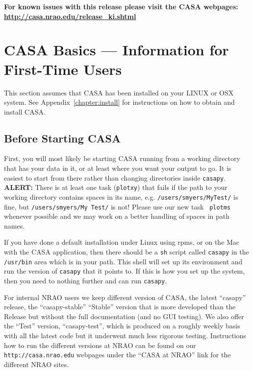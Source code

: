 {\bf For known issues with this release please visit the CASA webpages:\\ \url{http://casa.nrao.edu/release_ki.shtml}}


\section{CASA Basics --- Information for First-Time Users}
\label{section:intro.basics}

This section assumes that CASA has been installed on your LINUX or OSX
system.  See Appendix~\ref{chapter:install} for instructions on how to 
obtain and install CASA.  

\subsection{Before Starting CASA}
\label{section:intro.basics.before}

First, you will most likely be starting CASA running from a working
directory that has your data in it, or at least where you want your
output to go.  It is easiest to start from there rather than changing
directories inside {\tt casapy}.
{\bf ALERT:} There is at least one task ({\tt plotxy}) that 
fails if the path to your working directory contains spaces in
its name, e.g. {\tt /users/smyers/MyTest/} is fine, but 
{\tt /users/smyers/My\ Test/} is not!  Please use our new task {\tt
  plotms} whenever possible and we may work on a better handling of
spaces in path names. 

If you have done a default installation under Linux using rpms, or 
on the Mac with the CASA application, then there should be a {\tt sh}
script called {\tt casapy} in the {\tt /usr/bin} area which is in
your path.  This shell will set up its environment and run the version
of {\tt casapy} that it points to.  If this is how you set up the
system, then you need to nothing further and can run {\tt casapy}.


For internal NRAO users we keep different version of CASA, the latest
``casapy'' release, the ``casapy-stable'' ``Stable'' version that is more
developed than the Release but without the full documentation (and no
GUI testing). We also offer the ``Test'' version, ``casapy-test'', which is
produced on a roughly weekly basis with all the latest code but it
underwent much less rigorous testing. Instructions how to run the
different versions at NRAO can be found on our
\verb=http://casa.nrao.edu= webpages under
the ``CASA at NRAO'' link for the different NRAO sites.


